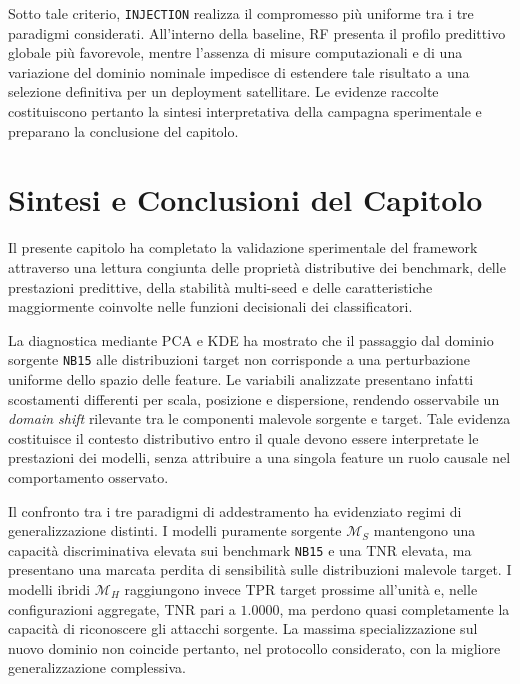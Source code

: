 Sotto tale criterio, \texttt{INJECTION} realizza il compromesso più uniforme tra i tre paradigmi considerati. 
All'interno della baseline, RF presenta il profilo predittivo globale più favorevole, mentre l'assenza di misure computazionali e di una variazione del dominio nominale impedisce di estendere tale risultato a una selezione definitiva per un deployment satellitare. 
Le evidenze raccolte costituiscono pertanto la sintesi interpretativa della campagna sperimentale e preparano la conclusione del capitolo.




\section{Sintesi e Conclusioni del Capitolo}
\label{sec:cap5_conclusioni}

Il presente capitolo ha completato la validazione sperimentale del framework attraverso una lettura congiunta delle proprietà distributive dei benchmark, delle prestazioni predittive, della stabilità multi-seed e delle caratteristiche maggiormente coinvolte nelle funzioni decisionali dei classificatori.

La diagnostica mediante PCA e KDE ha mostrato che il passaggio dal dominio sorgente \texttt{NB15} alle distribuzioni target non corrisponde a una perturbazione uniforme dello spazio delle feature. 
Le variabili analizzate presentano infatti scostamenti differenti per scala, posizione e dispersione, rendendo osservabile un \textit{domain shift} rilevante tra le componenti malevole sorgente e target. 
Tale evidenza costituisce il contesto distributivo entro il quale devono essere interpretate le prestazioni dei modelli, senza attribuire a una singola feature un ruolo causale nel comportamento osservato.

Il confronto tra i tre paradigmi di addestramento ha evidenziato regimi di generalizzazione distinti. 
I modelli puramente sorgente $\mathcal{M}_{S}$ mantengono una capacità discriminativa elevata sui benchmark \texttt{NB15} e una TNR elevata, ma presentano una marcata perdita di sensibilità sulle distribuzioni malevole target. 
I modelli ibridi $\mathcal{M}_{H}$ raggiungono invece TPR target prossime all'unità e, nelle configurazioni aggregate, TNR pari a $1.0000$, ma perdono quasi completamente la capacità di riconoscere gli attacchi sorgente. 
La massima specializzazione sul nuovo dominio non coincide pertanto, nel protocollo considerato, con la migliore generalizzazione complessiva.

